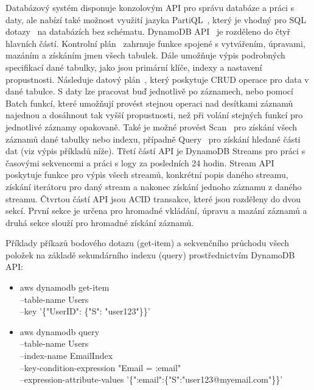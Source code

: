 \documentclass[czech,master,dept460,male,csharp,cpdeclaration]{diploma}
\begin{document}
	Databázový systém disponuje konzolovým API pro správu databáze a práci s daty, ale nabízí také možnost využití jazyka PartiQL~\cite{partiql}, který je vhodný pro SQL dotazy~\cite{what-is-sql} na databázích bez schématu. DynamoDB API~\cite{api-dynamodb} je rozděleno do čtyř hlavních částí. Kontrolní plán~\cite{control-plan-dynamodb, api-dynamodb} zahrnuje funkce spojené s vytvářením, úpravami, mazáním a získáním jmen všech tabulek. Dále umožňuje výpis podrobných specifikací dané tabulky, jako jsou primární klíče, indexy a nastavení propustnosti. Následuje datový plán~\cite{api-dynamodb}, který poskytuje CRUD operace pro data v dané tabulce. S daty lze pracovat buď jednotlivě po záznamech, nebo pomocí Batch funkcí, které umožňují provést stejnou operaci nad desítkami záznamů najednou a dosáhnout tak vyšší propustnosti, než při volání stejných funkcí pro jednotlivé záznamy opakovaně. Také je možné provést Scan~\cite{scan-dynamo} pro získání všech záznamů dané tabulky nebo indexu, případně Query~\cite{query-dynamo} pro získání hledané části dat (viz výpis příkladů níže). Třetí částí API je DynamoDB Streams pro práci s časovými sekvencemi a práci s logy za posledních 24 hodin. Stream API poskytuje funkce pro výpis všech streamů, konkrétní popis daného streamu, získání iterátoru pro daný stream a nakonec získání jednoho záznamu z daného streamu. Čtvrtou částí API jsou ACID transakce, které jsou rozděleny do dvou sekcí. První sekce je určena pro hromadné vkládání, úpravu a mazání záznamů a druhá sekce slouží pro hromadné získání záznamů.
	
	Příklady příkazů bodového dotazu (get-item) a sekvenčního průchodu všech položek na základě sekundárního indexu (query) prostřednictvím DynamoDB API:
	
	\begin{itemize}
		\item aws dynamodb get-item \\
		--table-name Users	\\
		--key '\{"UserID": \{"S": "user123"\}\}'
		\item aws dynamodb query \\
		--table-name Users \\
		--index-name EmailIndex \\
		--key-condition-expression "Email = :email" \\
		--expression-attribute-values '\{":email":\{"S":"user123@myemail.com"\}\}'~\cite{query-dynamo, scan-dynamo}
	\end{itemize}
	
\end{document}
